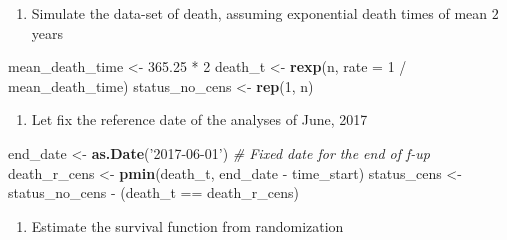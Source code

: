 \documentclass[]{book}
\newenvironment{Shaded}{\begin{snugshade}}{\end{snugshade}}
\newcommand{\KeywordTok}[1]{\textcolor[rgb]{0.13,0.29,0.53}{\textbf{{#1}}}}
\newcommand{\DataTypeTok}[1]{\textcolor[rgb]{0.13,0.29,0.53}{{#1}}}
\newcommand{\DecValTok}[1]{\textcolor[rgb]{0.00,0.00,0.81}{{#1}}}
\newcommand{\FloatTok}[1]{\textcolor[rgb]{0.00,0.00,0.81}{{#1}}}
\newcommand{\StringTok}[1]{\textcolor[rgb]{0.31,0.60,0.02}{{#1}}}
\newcommand{\CommentTok}[1]{\textcolor[rgb]{0.56,0.35,0.01}{\textit{{#1}}}}
\newcommand{\OtherTok}[1]{\textcolor[rgb]{0.56,0.35,0.01}{{#1}}}
\newcommand{\NormalTok}[1]{{#1}}
\providecommand{\tightlist}{%
  \setlength{\itemsep}{0pt}\setlength{\parskip}{0pt}}
\theoremstyle{definition}
\theoremstyle{definition}
\theoremstyle{definition}
\theoremstyle{remark}
\begin{document}
\begin{enumerate}
\def\labelenumi{\arabic{enumi}.}
\setcounter{enumi}{2}
\tightlist
\item
  Simulate the data-set of death, assuming exponential death times of
  mean \(2\) years
\end{enumerate}

\begin{Shaded}
\begin{Highlighting}[]
\NormalTok{mean_death_time <-}\StringTok{ }\FloatTok{365.25} \NormalTok{*}\StringTok{ }\DecValTok{2}
\NormalTok{death_t         <-}\StringTok{ }\KeywordTok{rexp}\NormalTok{(n, }\DataTypeTok{rate =} \DecValTok{1} \NormalTok{/}\StringTok{ }\NormalTok{mean_death_time)}
\NormalTok{status_no_cens  <-}\StringTok{ }\KeywordTok{rep}\NormalTok{(}\DecValTok{1}\NormalTok{, n)}
\end{Highlighting}
\end{Shaded}

\begin{enumerate}
\def\labelenumi{\arabic{enumi}.}
\setcounter{enumi}{3}
\tightlist
\item
  Let fix the reference date of the analyses of June, 2017
\end{enumerate}

\begin{Shaded}
\begin{Highlighting}[]
\NormalTok{end_date     <-}\StringTok{ }\KeywordTok{as.Date}\NormalTok{(}\StringTok{'2017-06-01'}\NormalTok{)           }\CommentTok{# Fixed date for the end of f-up}
\NormalTok{death_r_cens <-}\StringTok{ }\KeywordTok{pmin}\NormalTok{(death_t, end_date -}\StringTok{ }\NormalTok{time_start)}
\NormalTok{status_cens  <-}\StringTok{ }\NormalTok{status_no_cens -}\StringTok{ }\NormalTok{(death_t ==}\StringTok{ }\NormalTok{death_r_cens)}
\end{Highlighting}
\end{Shaded}

\begin{enumerate}
\def\labelenumi{\arabic{enumi}.}
\setcounter{enumi}{4}
\tightlist
\item
  Estimate the survival function from randomization
\end{enumerate}

\begin{Shaded}
\end{Shaded}
\end{document}
